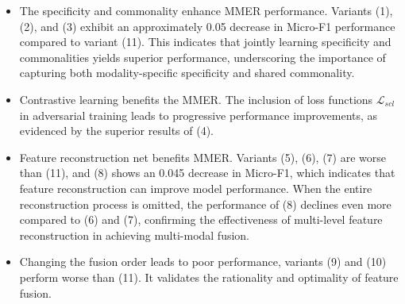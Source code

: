 \begin{itemize}
\item The specificity and commonality enhance MMER performance. Variants (1), (2), and (3) exhibit an approximately 0.05 decrease in Micro-F1 performance compared to variant (11). This indicates that jointly learning specificity and commonalities yields superior performance, underscoring the importance of capturing both modality-specific specificity and shared commonality.

\item  Contrastive learning benefits the MMER. The inclusion of loss functions $\mathcal{L}_{scl}$ in adversarial training leads to progressive performance improvements, as evidenced by the superior results of (4). 


\item Feature reconstruction net benefits MMER. Variants (5), (6), (7) are worse than (11), and (8) shows an 0.045 decrease in Micro-F1, which indicates that feature reconstruction can improve model performance. When the entire reconstruction process is omitted, the performance of (8) declines even more compared to (6) and (7), confirming the effectiveness of multi-level feature reconstruction in achieving multi-modal fusion.

\item Changing the fusion order leads to poor performance, variants (9) and (10) perform worse than (11). It validates the rationality and optimality of feature fusion.
\end{itemize}
 

